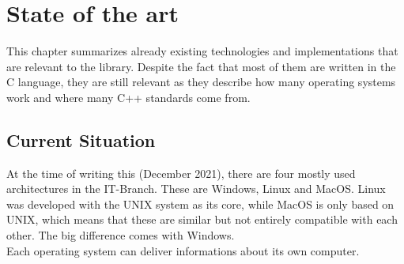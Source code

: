 \chapter{State of the art}
This chapter summarizes already existing technologies and implementations that are relevant to the library. Despite the fact that most of them are written in the C language, they are still relevant as they describe how many operating systems work and where many C++ standards come from.   
\section{Current Situation} 
At the time of writing this (December 2021), there are four mostly used architectures in the IT-Branch. These are Windows, Linux and MacOS. Linux was developed with the UNIX system as its core, while MacOS is only based on UNIX, which means that these are similar but not entirely compatible with each other. The big difference comes with Windows.\\
Each operating system can deliver informations about its own computer.


